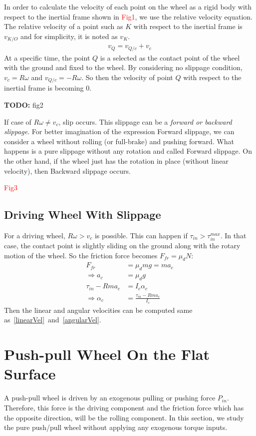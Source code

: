 \documentclass[letterpaper, 10pt, conference]{ieeeconf}
\newcommand{\TODO}[1]{{\color{red} {\bf TODO:} {#1}}}
\begin{document}
In order to calculate the velocity of each point on the wheel as a rigid body with respect to the inertial frame shown in \textcolor{red}{Fig1}, we use the relative velocity equation. The relative velocity of a point such as $K$ with respect to the inertial frame is $v_{K/O}$ and for simplicity, it is noted as $v_K$.
\begin{align}
v_Q = v_{Q/c} + v_c
\end{align}
At a specific time, the point $Q$ is a selected as the contact point of the wheel with the ground and fixed to the wheel. By considering no slippage condition, $v_c = R\omega$ and $v_{Q/c} = -R\omega$. So then the velocity of point $Q$ with respect to the inertial frame is becoming $0$.

\TODO{fig2}

If case of $R\omega \neq v_c$, slip occurs. This slippage can be a \emph{forward or backward slippage}. For better imagination of the expression Forward slippage, we can consider a wheel without rolling (or full-brake) and pushing forward. What happens is a pure slippage without any rotation and called Forward slippage. On the other hand, if the wheel just has the rotation in place (without linear velocity), then Backward slippage occurs.

\textcolor{red}{Fig3}
\subsection{Driving Wheel With Slippage}
For a driving wheel, $R\omega > v_c$ is possible. This can happen if $\tau_{in} > \tau_{in}^{max}$. In that case, the contact point is slightly sliding on the ground along with the rotary motion of the wheel. So the friction force becomes $F_{fr} = \mu_d N$:
\begin{align}
F_{fr} &= \mu_d mg = ma_c \\
\Rightarrow a_c &= \mu_dg \\
\tau_{in} - Rma_c &= I_c \alpha_c \\
\Rightarrow \alpha_c &= \frac{\tau_{in} - Rma_c}{I_c}
\end{align}
Then the linear and angular velocities can be computed same as~\eqref{linearVel}~and~\eqref{angularVel}.

\section{Push-pull Wheel On the Flat Surface}
A push-pull wheel is driven by an exogenous pulling or pushing force $P_{in}$. Therefore, this force is the driving component and the friction force which has the opposite direction, will be the rolling component. In this section, we study the pure push/pull wheel without applying any exogenous torque inputs.
\end{document}
